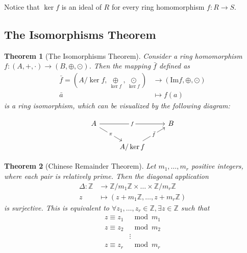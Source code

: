 \documentclass[12pt,a4paper]{article}
\newtheorem{theorem}{Theorem}[section]
\theoremstyle{definition}
\begin{document}
Notice that $\ker f$ is an ideal of $R$ for every ring homomorphism $f : R \longrightarrow S$.

\subsection{The Isomorphisms Theorem}

\begin{theorem}[The Isomorphisms Theorem]
Consider a ring homomorphism $f : (A, +, \cdot) \longrightarrow (B, \oplus, \odot)$. Then the mapping $\bar{f}$ defined as
\begin{equation*}
\begin{aligned}
\bar{f} = (A/ \ker f, \underset{\ker f}{\oplus}, \underset{\ker f}{\odot}) & \longrightarrow (\text{Im} f, \oplus, \odot) \\
\bar{a} & \longmapsto f(a)
\end{aligned}
\end{equation*}
is a ring isomorphism, which can be visualized by the following diagram:

\[\begin{tikzcd}
	A && B \\
	& {A/ \ker f}
	\arrow["{\bar{f}}"{description}, from=2-2, to=1-3]
	\arrow["f"{description}, from=1-1, to=1-3]
	\arrow["\pi"{description}, from=1-1, to=2-2]
\end{tikzcd}\]

\end{theorem}

\begin{theorem}[Chinese Remainder Theorem]
Let $m_1, \ldots, m_r$ positive integers, where each pair is relatively prime. Then the diagonal application
\begin{equation*}
\begin{aligned}
\Delta : \mathbb{Z} & \to \mathbb{Z}/m_1\mathbb{Z} \times \ldots \times \mathbb{Z}/m_r \mathbb{Z} \\
z & \mapsto (z+m_1\mathbb{Z}, \ldots, z+m_r\mathbb{Z})
\end{aligned}
\end{equation*}
is surjective. This is equivalent to $\forall z_1, \ldots, z_r \in \mathbb{Z}, \exists z \in \mathbb{Z}$ such that
\begin{equation*}
\begin{aligned}
z \equiv z_1 & \mod m_1  \\
z \equiv z_2 & \mod m_2  \\
& \vdots \\
z \equiv z_r & \mod m_r  \\
\end{aligned}
\end{equation*}
\end{theorem}
\end{document}
